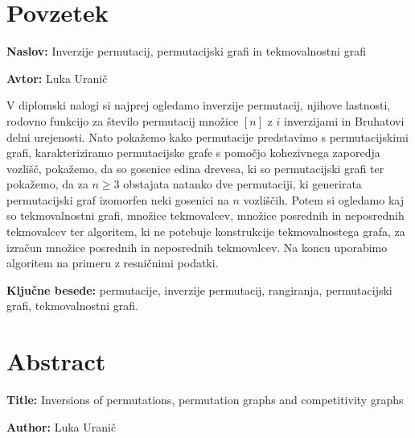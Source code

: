 \documentclass[a4paper, 12pt]{book}
\newcommand{\ttitle}{Inverzije permutacij, permutacijski grafi in tekmovalnostni grafi}
\newcommand{\ttitleEn}{Inversions of permutations, permutation graphs and competitivity graphs}
\newcommand{\tauthor}{Luka Uranič}
\newcommand{\tkeywords}{permutacije, inverzije permutacij, rangiranja, permutacijski grafi, tekmovalnostni grafi}
\newcommand{\clearemptydoublepage}{\newpage{\pagestyle{empty}\cleardoublepage}}
\begin{document}

\chapter*{Povzetek}

\noindent\textbf{Naslov:} \ttitle
\bigskip

\noindent\textbf{Avtor:} \tauthor
\bigskip

\noindent V diplomski nalogi si najprej ogledamo inverzije permutacij, njihove lastnosti, rodovno funkcijo za število permutacij množice $[n]$ z $i$ inverzijami in Bruhatovi delni urejenosti.
Nato pokažemo kako permutacije predstavimo s permutacijskimi grafi, karakteriziramo permutacijske grafe s pomočjo kohezivnega zaporedja vozlišč, pokažemo, da so gosenice edina drevesa, ki so permutacijski grafi ter pokažemo, da za $n \geq 3$ obstajata natanko dve permutaciji, ki generirata permutacijski graf izomorfen neki gosenici na $n$ vozliščih. Potem si ogledamo kaj so tekmovalnostni grafi, množice tekmovalcev, množice posrednih in neposrednih tekmovalcev ter algoritem, ki ne potebuje konstrukcije tekmovalnostega grafa, za izračun množice posrednih in neposrednih tekmovalcev. Na koncu uporabimo algoritem na primeru z resničnimi podatki.


\bigskip

\noindent\textbf{Ključne besede:} \tkeywords.
\clearemptydoublepage

\chapter*{Abstract}

\noindent\textbf{Title:} \ttitleEn
\bigskip

\noindent\textbf{Author:} \tauthor
\bigskip
\end{document}
